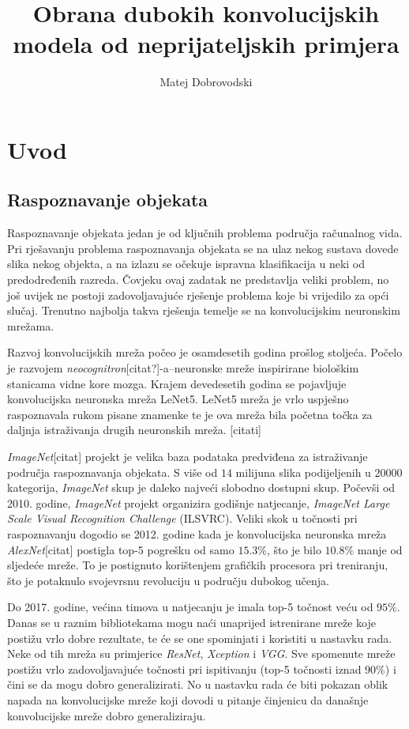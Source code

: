 \documentclass[utf8, diplomski]{fer}
\begin{document}
\title{Obrana dubokih konvolucijskih modela od neprijateljskih primjera}
\author{Matej Dobrovodski}

\maketitle

\tableofcontents

\chapter{Uvod}
\section{Raspoznavanje objekata}
Raspoznavanje objekata jedan je od ključnih problema područja računalnog vida. Pri rješavanju problema raspoznavanja objekata se na ulaz nekog sustava dovede slika nekog objekta, a na izlazu se očekuje ispravna klasifikacija u neki od predodređenih razreda. Čovjeku ovaj zadatak ne predstavlja veliki problem, no još uvijek ne postoji zadovoljavajuće rješenje problema koje bi vrijedilo za opći slučaj. Trenutno najbolja takva rješenja temelje se na konvolucijskim neuronskim mrežama. \par
Razvoj konvolucijskih mreža počeo je osamdesetih godina prošlog stoljeća. Počelo je razvojem \textit{neocognitron}[citat?]-a--neuronske mreže inspirirane biološkim stanicama vidne kore mozga. Krajem devedesetih godina se pojavljuje konvolucijska neuronska mreža LeNet5. LeNet5 mreža je vrlo uspješno raspoznavala rukom pisane znamenke te je ova mreža bila početna točka za daljnja istraživanja drugih neuronskih mreža. [citati] \par
\textit{ImageNet}[citat] projekt je velika baza podataka predviđena za istraživanje područja raspoznavanja objekata. S više od $14$ milijuna slika podijeljenih u $20000$ kategorija, \textit{ImageNet} skup je daleko najveći slobodno dostupni skup. Počevši od 2010. godine, \textit{ImageNet} projekt organizira godišnje natjecanje, \textit{ImageNet Large Scale Visual Recognition Challenge} (ILSVRC). Veliki skok u točnosti pri raspoznavanju dogodio se 2012. godine kada je konvolucijska neuronska mreža \textit{AlexNet}[citat] postigla top-5 pogrešku od samo $15.3\%$, što je bilo $10.8\%$ manje od sljedeće mreže. To je postignuto korištenjem grafičkih procesora pri treniranju, što je potaknulo svojevrsnu revoluciju u području dubokog učenja. \par
Do 2017. godine, većina timova u natjecanju je imala top-5 točnost veću od $95\%$. Danas se u raznim bibliotekama mogu naći unaprijed istrenirane mreže koje postižu vrlo dobre rezultate, te će se one spominjati i koristiti u nastavku rada. Neke od tih mreža su primjerice \textit{ResNet}, \textit{Xception} i \textit{VGG}. Sve spomenute mreže postižu vrlo zadovoljavajuće točnosti pri ispitivanju (top-5 točnosti iznad $90\%$) i čini se da mogu dobro generalizirati. No u nastavku rada će biti pokazan oblik napada na konvolucijske mreže koji dovodi u pitanje činjenicu da današnje konvolucijske mreže dobro generaliziraju.
\end{document}
